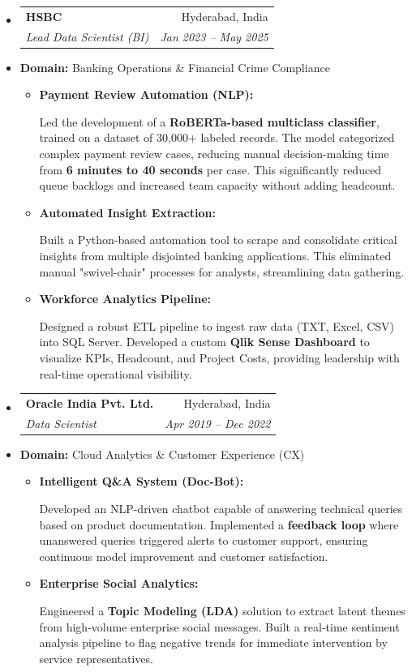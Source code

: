 \documentclass[10pt,a4paper]{article}
\makeatletter
\newcommand{\resumeItem}[1]{
  \item\small{
    {#1 \vspace{-2pt}}
  }
}
\newcommand{\resumeSubheading}[4]{
  \vspace{-1pt}\item
    \begin{tabular*}{0.97\textwidth}[t]{l@{\extracolsep{\fill}}r}
      \textbf{#1} & #2 \\
      \textit{\small#3} & \textit{\small #4} \\
    \end{tabular*}\vspace{-5pt}
}
\makeatother
\begin{document}
\begin{itemize}[leftmargin=0.15in, label={}]
  \resumeSubheading
      {HSBC}{Hyderabad, India}
      {Lead Data Scientist (BI)}{Jan 2023 -- May 2025}
      \resumeItem{\textbf{Domain:} Banking Operations \& Financial Crime Compliance}
      \begin{itemize}
        \resumeItem{\textbf{Payment Review Automation (NLP):}}
          {Led the development of a \textbf{RoBERTa-based multiclass classifier}, trained on a dataset of 30,000+ labeled records. The model categorized complex payment review cases, reducing manual decision-making time from \textbf{6 minutes to 40 seconds} per case. This significantly reduced queue backlogs and increased team capacity without adding headcount.}
        \resumeItem{\textbf{Automated Insight Extraction:}}
          {Built a Python-based automation tool to scrape and consolidate critical insights from multiple disjointed banking applications. This eliminated manual "swivel-chair" processes for analysts, streamlining data gathering.}
        \resumeItem{\textbf{Workforce Analytics Pipeline:}}
          {Designed a robust ETL pipeline to ingest raw data (TXT, Excel, CSV) into SQL Server. Developed a custom \textbf{Qlik Sense Dashboard} to visualize KPIs, Headcount, and Project Costs, providing leadership with real-time operational visibility.}
      \end{itemize}

  \resumeSubheading
      {Oracle India Pvt. Ltd.}{Hyderabad, India}
      {Data Scientist}{Apr 2019 -- Dec 2022}
      \resumeItem{\textbf{Domain:} Cloud Analytics \& Customer Experience (CX)}
      \begin{itemize}
        \resumeItem{\textbf{Intelligent Q\&A System (Doc-Bot):}}
          {Developed an NLP-driven chatbot capable of answering technical queries based on product documentation. Implemented a \textbf{feedback loop} where unanswered queries triggered alerts to customer support, ensuring continuous model improvement and customer satisfaction.}
        \resumeItem{\textbf{Enterprise Social Analytics:}}
          {Engineered a \textbf{Topic Modeling (LDA)} solution to extract latent themes from high-volume enterprise social messages. Built a real-time sentiment analysis pipeline to flag negative trends for immediate intervention by service representatives.}
      \end{itemize}


\end{itemize}
\end{document}
